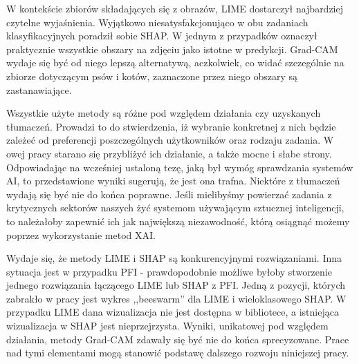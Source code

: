 W kontekście zbiorów składających się z obrazów, LIME dostarczył najbardziej czytelne wyjaśnienia. Wyjątkowo niesatysfakcjonująco w obu zadaniach klasyfikacyjnych poradził sobie SHAP. W jednym z przypadków oznaczył praktycznie wszystkie obszary na zdjęciu jako istotne w predykcji. Grad-CAM wydaje się być od niego lepszą alternatywą, aczkolwiek, co widać szczególnie na zbiorze dotyczącym psów i kotów, zaznaczone przez niego obszary są zastanawiające.   

Wszystkie użyte metody są różne pod względem działania czy uzyskanych tłumaczeń. Prowadzi to do stwierdzenia, iż wybranie konkretnej z nich będzie zależeć od preferencji poszczególnych użytkowników oraz rodzaju zadania. W owej pracy starano się przybliżyć ich działanie, a także mocne i słabe strony. Odpowiadając na wcześniej ustaloną tezę, jaką był wymóg sprawdzania systemów AI, to przedstawione wyniki sugerują, że jest ona trafna. Niektóre z tłumaczeń wydają się być nie do końca poprawne. Jeśli mielibyśmy powierzać zadania z krytycznych sektorów naszych żyć systemom używającym sztucznej inteligencji, to należałoby zapewnić ich jak największą niezawodność, którą osiągnąć możemy poprzez wykorzystanie metod XAI. 

Wydaje się, że metody LIME i SHAP są konkurencyjnymi rozwiązaniami. Inna sytuacja jest w przypadku PFI - prawdopodobnie możliwe byłoby stworzenie jednego rozwiązania łączącego LIME lub SHAP z PFI. 
Jedną z pozycji, których zabrakło w pracy jest wykres ,,beeswarm'' dla LIME i wieloklasowego SHAP. W przypadku LIME dana wizualizacja nie jest dostępna w bibliotece, a istniejąca wizualizacja w SHAP jest nieprzejrzysta. Wyniki, unikatowej pod względem działania, metody Grad-CAM zdawały się być nie do końca sprecyzowane. 
Prace nad tymi elementami mogą stanowić podstawę dalszego rozwoju niniejszej pracy.  

